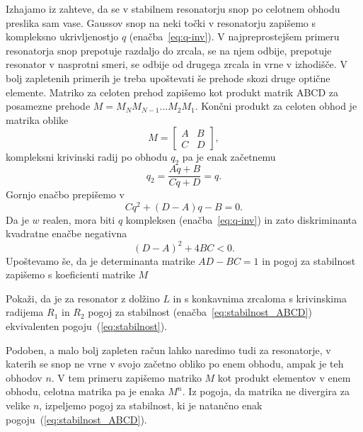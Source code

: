 Izhajamo iz zahteve, da se v stabilnem resonatorju snop po celotnem obhodu
preslika sam vase. Gaussov snop na neki točki v resonatorju 
zapišemo s kompleksno ukrivljenostjo $q$ (enačba~\ref{eq:q-inv}).
V najpreprostejšem primeru resonatorja snop prepotuje razdaljo do zrcala, se na njem 
odbije, prepotuje resonator v nasprotni smeri, se odbije od drugega zrcala in vrne 
v izhodišče. V bolj zapletenih primerih je treba upoštevati še 
prehode skozi druge optične elemente. Matriko 
za celoten prehod zapišemo kot produkt matrik ABCD za posamezne prehode $M = M_N M_{N-1} ...M_2 M_1$.
Končni produkt za celoten obhod je matrika oblike
\begin{equation}
M = \left[\begin{array}{cc}
A & B\\
C & D
\end{array}\right],
\end{equation}
kompleksni krivinski radij po obhodu $q_2$ pa je enak začetnemu
\begin{equation}
q_2 = \frac{Aq+B}{Cq+D} = q.
\end{equation}
Gornjo enačbo prepišemo v 
\begin{equation}
Cq^2+(D-A)q-B=0.
\end{equation}
Da je $w$ realen, mora biti $q$ kompleksen (enačba~\ref{eq:q-inv}) 
in zato diskriminanta kvadratne enačbe negativna
\begin{equation}
(D-A)^2+ 4BC<0.
\end{equation}
Upoštevamo še, da je determinanta matrike $AD-BC=1$ in pogoj za 
stabilnost zapišemo s koeficienti matrike $M$

\begin{definition}
Pokaži, da je za resonator z dolžino $L$ in s konkavnima zrcaloma s krivinskima radijema $R_1$ in $R_2$ 
pogoj za stabilnost (enačba~\ref{eq:stabilnost_ABCD}) ekvivalenten pogoju~(\ref{eq:stabilnost}).
\end{definition}

\begin{remark}
Podoben, a malo bolj zapleten račun lahko naredimo tudi za resonatorje, v katerih se snop 
ne vrne v svojo začetno obliko po enem obhodu, ampak je teh obhodov $n$. V tem primeru zapišemo
matriko $M$ kot produkt elementov v enem obhodu, celotna matrika pa je enaka $M^n$. Iz pogoja,
da matrika ne divergira za velike $n$, izpeljemo pogoj za stabilnost, ki je natančno 
enak pogoju~(\ref{eq:stabilnost_ABCD}). 
\end{remark}


